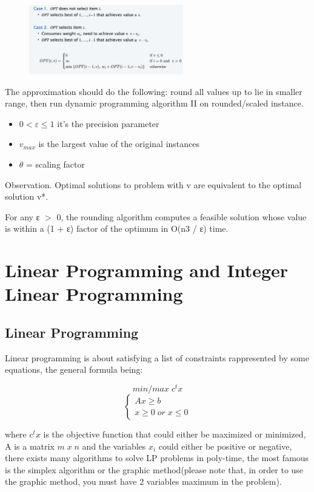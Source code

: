 \documentclass[11pt]{article}
\begin{document}
\begin{figure}[H]
		\centering
		\includegraphics[width=0.6\textwidth ]{knapsackII}
		
\end{figure}
 The approximation should do the following: round all values up to lie in smaller range, then run dynamic programming algorithm II on rounded/scaled instance.
 
 \begin{itemize}
 \item{$0<ε\leq1$ it's the precision parameter}
 \item{$v_{max}$ is the largest value of the original instances}
 \item{$\theta$ = scaling factor }
 \end{itemize}
 
 Observation. Optimal solutions to problem with v are equivalent to the optimal solution v*.
 
 For any ε $>$ 0, the rounding algorithm computes a feasible solution whose value is within a (1 + ε) factor of the optimum in O(n3 / ε) time.
 
 \clearpage
 
 \section{Linear Programming and Integer Linear Programming}
 
 \subsection{Linear Programming}
 
 Linear programming is about satisfying a list of constraints rappresented by some equations, the general formula being:
 
 \[min/max \; c^{t}x\]
 \[\begin{cases} Ax \geq b \\ x \geq 0 \; or \; x \leq 0 \end{cases}\]
 
where $c^{t}x$ is the objective function that could either be maximized or minimized, A is a matrix $m \; x \; n$ and the variables $x_{i}$ could either be positive or negative, there exists many algorithms to solve LP problems in poly-time, the most famous is the simplex algorithm or the graphic method(please note that, in order to use the graphic method, you must have 2 variables maximum in the problem).
 
\end{document}

